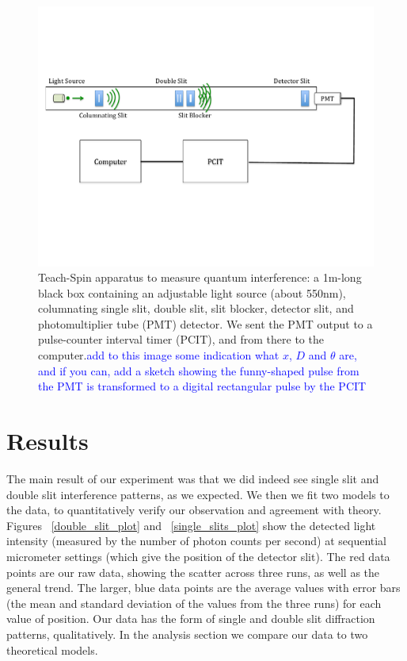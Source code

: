 \documentclass[prb,preprint]{revtex4-1}
\begin{document}
\begin{figure}[h!]
\centering
\includegraphics[width=6in]{set-up.pdf}
\caption{Teach-Spin apparatus to measure quantum interference: a 1m-long black box containing an adjustable light source (about 550nm), columnating single slit, double slit, slit blocker, detector slit, and photomultiplier tube (PMT) detector. We sent the PMT output to a pulse-counter interval timer (PCIT), and from there to the computer.\textcolor{blue}{add to this image some indication what $x$, $D$ and $\theta$ are, and if you can, add a sketch showing the funny-shaped pulse from the PMT is transformed to a digital rectangular pulse by the PCIT} }
\label{set-up}
\end{figure}

\section{Results}

The main result of our experiment was that we did indeed see single slit and double slit interference patterns, as we expected.  We then we fit two models to the data, to quantitatively verify our observation and agreement with theory.  Figures ~\ref{double_slit_plot} and ~\ref{single_slits_plot} show the detected light intensity (measured by the number of photon counts per second) at sequential micrometer settings (which give the position of the detector slit). The red data points are our raw data, showing the scatter across three runs, as well as the general trend. The larger, blue data points are the average values with error bars (the mean and standard deviation of the values from the three runs) for each value of position.  Our data has the form of single and double slit diffraction patterns, qualitatively.  In the analysis section we compare our data to two theoretical models. 
\end{document}
